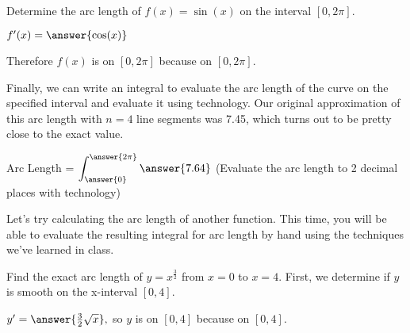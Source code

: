 \documentclass{ximera}
\begin{document}
\begin{problem}

Determine the arc length of $f(x) = \sin(x)$ on the interval $[0, 2\pi].$

$f'(x) = \answer{\cos(x)}$

\begin{problem}

Therefore $f(x)$ is  on $[0,2\pi]$ because  on $[0,2\pi]$.  

\begin{problem}

Finally, we can write an integral to evaluate the arc length of the curve on the specified interval and evaluate it using technology.  Our original approximation of this arc length with $n=4$ line segments was 7.45, which turns out to be pretty close to the exact value.  

Arc Length = $\displaystyle\int_{\answer{0}}^{\answer{2\pi}} \answer{7.64}$ (Evaluate the arc length to 2 decimal places with technology)

\end{problem}
\end{problem}
\end{problem}

Let's try calculating the arc length of another function.  This time, you will be able to evaluate the resulting integral for arc length by hand using the techniques we've learned in class.

\begin{problem}

Find the exact arc length of $y = x^{\frac{3}{2}}$ from $x=0$ to $x=4$.  First, we determine if $y$ is smooth on the x-interval $[0,4]$.  

$y' = \answer{\frac{3}{2}\sqrt{x}},$ so $y$ is  on $[0,4]$ because  on $[0,4]$.  

\end{problem}
\end{document}
